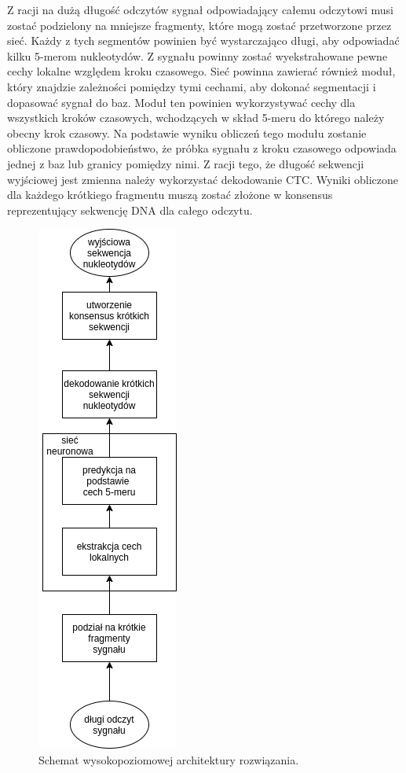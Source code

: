 \documentclass[a4paper,11pt,twoside]{report}
\theoremstyle{definition}
\begin{document}
Z racji na dużą długość odczytów sygnał odpowiadający całemu odczytowi musi zostać podzielony na mniejsze fragmenty, które mogą zostać przetworzone przez sieć. Każdy z tych segmentów powinien być wystarczająco długi, aby odpowiadać kilku 5-merom nukleotydów. Z sygnału powinny zostać wyekstrahowane pewne cechy lokalne względem kroku czasowego. Sieć powinna zawierać również moduł, który znajdzie zależności pomiędzy tymi cechami, aby dokonać segmentacji i dopasować sygnał do baz. Moduł ten powinien wykorzystywać cechy dla wszystkich kroków czasowych, wchodzących w skład 5-meru do którego należy obecny krok czasowy. Na podstawie wyniku obliczeń tego modułu zostanie obliczone prawdopodobieństwo, że próbka sygnału z kroku czasowego odpowiada jednej z baz lub granicy pomiędzy nimi. Z racji tego, że długość sekwencji wyjściowej jest zmienna należy wykorzystać dekodowanie CTC\cite{ctc}. Wyniki obliczone dla każdego krótkiego fragmentu muszą zostać złożone w konsensus reprezentujący sekwencję DNA dla całego odczytu.

\begin{figure}[h!]
	\centering
	\includegraphics[scale=0.5]{architecture}
	\caption{Schemat wysokopoziomowej architektury rozwiązania.}
\end{figure}
\end{document}
